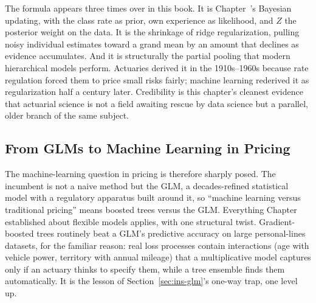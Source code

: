 \documentclass[../ai_in_finance]{subfiles}
\begin{document}
The formula appears three times over in this book. It is Chapter~'s Bayesian updating, with the class rate as prior, own experience as likelihood, and $Z$ the posterior weight on the data. It is the shrinkage of ridge regularization, pulling noisy individual estimates toward a grand mean by an amount that declines as evidence accumulates. And it is structurally the partial pooling that modern hierarchical models perform. Actuaries derived it in the 1910s--1960s because rate regulation forced them to price small risks fairly; machine learning rederived it as regularization half a century later. Credibility is this chapter's cleanest evidence that actuarial science is not a field awaiting rescue by data science but a parallel, older branch of the same subject.

\subsection{From GLMs to Machine Learning in Pricing}
\label{sec:ins-ml-pricing}

The machine-learning question in pricing is therefore sharply posed. The incumbent is not a naive method but the GLM, a decades-refined statistical model with a regulatory apparatus built around it, so ``machine learning versus traditional pricing'' means boosted trees versus the GLM. Everything Chapter~ established about flexible models applies, with one structural twist. Gradient-boosted trees routinely beat a GLM's predictive accuracy on large personal-lines datasets, for the familiar reason: real loss processes contain interactions (age with vehicle power, territory with annual mileage) that a multiplicative model captures only if an actuary thinks to specify them, while a tree ensemble finds them automatically. It is the lesson of Section~\ref{sec:ins-glm}'s one-way trap, one level up.

\label{sec:ins-interaction}
\end{document}
